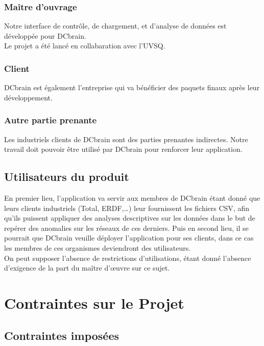 			\subsubsection{Maître d'ouvrage}
			Notre interface de contrôle, de chargement, et d'analyse de données est développée pour DCbrain.\\
			Le projet a été lancé en collabaration avec l'UVSQ.
			
			\subsubsection{Client}
			DCbrain est également l'entreprise qui va bénéficier des paquets finaux après leur développement.
			
			\subsubsection{Autre partie prenante}
			Les industriels clients de DCbrain sont des parties prenantes indirectes. Notre travail doit pouvoir être utilisé par DCbrain pour renforcer leur application.
			
		\subsection{Utilisateurs du produit}
		En premier lieu, l’application va servir aux membres de DCbrain étant donné que leurs clients industriels (Total, ERDF,…) leur fournissent les fichiers CSV, afin qu’ils puissent appliquer des analyses descriptives sur les données dans le but de repérer des anomalies sur les réseaux de ces derniers. Puis en second lieu, il se pourrait que DCbrain veuille déployer l'application pour ses clients, dans ce cas les membres de ces organismes deviendront des utilisateurs.\\
		
		On peut supposer l'absence de restrictions d'utilisations, étant donné l'absence d'exigence de la part du maître d'œuvre sur ce sujet.

	\section{Contraintes sur le Projet}
		\subsection{Contraintes imposées}
